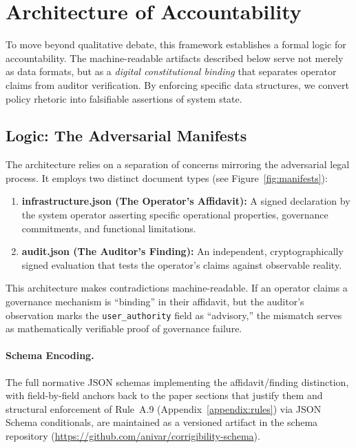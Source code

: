 \documentclass{article}
\begin{document}
\appendix

\section{Architecture of Accountability}
\label{appendix:architecture}

To move beyond qualitative debate, this framework establishes a formal logic for accountability. The machine-readable artifacts described below serve not merely as data formats, but as a \textit{digital constitutional binding} that separates operator claims from auditor verification. By enforcing specific data structures, we convert policy rhetoric into falsifiable assertions of system state.

\subsection{Logic: The Adversarial Manifests}

The architecture relies on a separation of concerns mirroring the adversarial legal process. It employs two distinct document types (see Figure~\ref{fig:manifests}):

\begin{enumerate}
    \item \textbf{infrastructure.json (The Operator's Affidavit):} A signed declaration by the system operator asserting specific operational properties, governance commitments, and functional limitations.
    \item \textbf{audit.json (The Auditor's Finding):} An independent, cryptographically signed evaluation that tests the operator's claims against observable reality.
\end{enumerate}

This architecture makes contradictions machine-readable. If an operator claims a governance mechanism is ``binding'' in their affidavit, but the auditor's observation marks the \texttt{user\_authority} field as ``advisory,'' the mismatch serves as mathematically verifiable proof of governance failure.

\paragraph{Schema Encoding.} The full normative JSON schemas implementing the affidavit/finding distinction, with field-by-field anchors back to the paper sections that justify them and structural enforcement of Rule~A.9 (Appendix~\ref{appendix:rules}) via JSON Schema conditionals, are maintained as a versioned artifact in the schema repository (\url{https://github.com/anivar/corrigibility-schema}).
\end{document}

